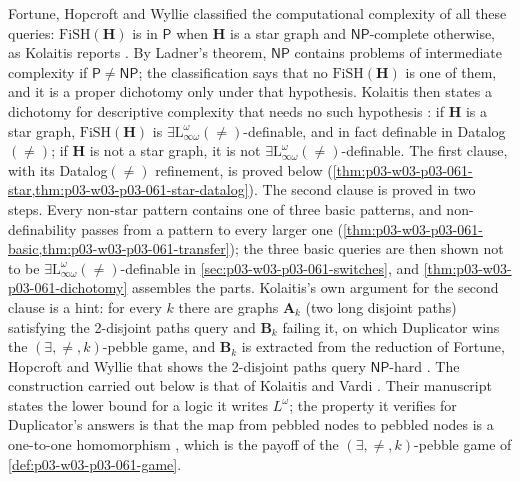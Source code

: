 Fortune, Hopcroft and Wyllie classified the computational complexity of all
these queries: \(\mathrm{FiSH}(\mathbf H)\) is in \(\mathsf P\) when
\(\mathbf H\) is a star graph and \(\mathsf{NP}\)-complete otherwise, as
Kolaitis reports \cite[Thm~8.18, p.~78]{Kolaitis2003ExpressivePowerNotes}. By
Ladner's theorem, \(\mathsf{NP}\) contains problems of intermediate
complexity if \(\mathsf P\neq\mathsf{NP}\); the classification says that no
\(\mathrm{FiSH}(\mathbf H)\) is one of them, and it is a proper dichotomy only
under that hypothesis. Kolaitis then states a dichotomy for descriptive
complexity that needs no such hypothesis \cite[Thm~8.19, p.~79]{Kolaitis2003ExpressivePowerNotes}:
if \(\mathbf H\) is a star graph, \(\mathrm{FiSH}(\mathbf H)\) is
\(\exists\mathrm L^\omega_{\infty\omega}(\neq)\)-definable, and in fact
definable in Datalog\((\neq)\); if \(\mathbf H\) is not a star graph, it is
not \(\exists\mathrm L^\omega_{\infty\omega}(\neq)\)-definable. The first
clause, with its Datalog\((\neq)\) refinement, is proved below
(\cref{thm:p03-w03-p03-061-star,thm:p03-w03-p03-061-star-datalog}). The
second clause is proved in two steps. Every non-star pattern contains one of
three basic patterns, and non-definability passes from a pattern to every
larger one (\cref{thm:p03-w03-p03-061-basic,thm:p03-w03-p03-061-transfer});
the three basic queries are then shown not to be
\(\exists\mathrm L^\omega_{\infty\omega}(\neq)\)-definable in
\cref{sec:p03-w03-p03-061-switches}, and
\cref{thm:p03-w03-p03-061-dichotomy} assembles the parts. Kolaitis's own
argument for the second clause is a hint: for every \(k\) there are graphs
\(\mathbf A_k\) (two long disjoint paths) satisfying the 2-disjoint paths
query and \(\mathbf B_k\) failing it, on which Duplicator wins the
\((\exists,\neq,k)\)-pebble game, and \(\mathbf B_k\) is extracted from the
reduction of Fortune, Hopcroft and Wyllie that shows the 2-disjoint paths
query \(\mathsf{NP}\)-hard \cite[p.~79]{Kolaitis2003ExpressivePowerNotes}.
The construction carried out below is that of Kolaitis and Vardi
\cite[Thms~6.6--6.7, pp.~34--39]{KolaitisVardi1995DatalogManuscript}. Their
manuscript states the lower bound for a logic it writes \(L^\omega\); the
property it verifies for Duplicator's answers is that the map from pebbled
nodes to pebbled nodes is a one-to-one homomorphism
\cite[p.~38]{KolaitisVardi1995DatalogManuscript}, which is the payoff of the
\((\exists,\neq,k)\)-pebble game of \cref{def:p03-w03-p03-061-game}.

